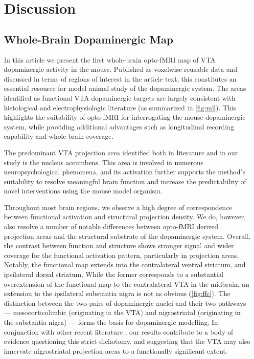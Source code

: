 \section{Discussion}

\subsection{Whole-Brain Dopaminergic Map}

In this article we present the first whole-brain opto-fMRI map of VTA dopaminergic activity in the mouse.
Published as voxelwise reusable data and discussed in terms of regions of interest in the article text, this constitutes an essential resource for model animal study of the dopaminergic system.
The areas identified as functional VTA dopaminergic targets are largely consistent with histological and electrophysiologic literature (as summarized in \cref{fig:ml}).
This highlights the suitability of opto-fMRI for interrogating the mouse dopaminergic system, while providing additional advantages such as longitudinal recording capability and whole-brain coverage.

The predominant VTA projection area identified both in literature and in our study is the nucleus accumbens.
This area is involved in numerous neuropsychological phenomena, and its activation further supports the method's suitability to resolve meaningful brain function and increase the predictability of novel interventions using the mouse model organism.

Throughout most brain regions, we observe a high degree of correspondence between functional activation and structural projection density.
We do, however, also resolve a number of notable differences between opto-fMRI derived projection areas and the structural substrate of the dopaminergic system.
Overall, the contrast between function and structure shows stronger signal and wider coverage for the functional activation pattern, particularly in projection areas.
Notably, the functional map extends into the contralateral ventral striatum, and ipsilateral dorsal striatum.
While the former corresponds to a substantial overextension of the functional map to the contralateral VTA in the midbrain, an extension to the ipsilateral substantia nigra is not as obvious (\cref{fig:ffc}).
The distinction between the two pairs of dopaminergic nuclei and their two pathways --- mesocorticolimbic (originating in the VTA) and nigrostriatal (originating in the substantia nigra) --- forms the basis for dopaminergic modelling.
In conjunction with other recent literature \cite{Lohani2016,Pan2010}, our results contribute to a body of evidence questioning this strict dichotomy, and suggesting that the VTA may also innervate nigrostriatal projection areas to a functionally significant extent.

